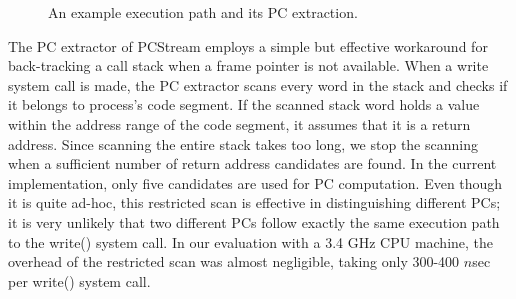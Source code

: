 \begin{figure}[t]
	\centering
	\hfill
	\caption{An example execution path and its PC extraction.} %
	\label{fig:getpc}
\end{figure}

The PC extractor of \textsf{\small PCStream} employs a simple but effective
workaround for back-tracking a call stack when a frame pointer is not
available.  When a write system call is made, the PC extractor scans every word
in the stack and checks if it belongs to process's code segment.  If the
scanned stack word holds a value within the address range of the code segment,
it assumes that it is a return address.  Since scanning the entire stack takes
too long, we stop the scanning when a sufficient number of return address
candidates are found. In the current implementation, only five candidates are
used for PC computation.  Even though it is quite ad-hoc, this restricted scan
is effective in distinguishing different PCs; it is very unlikely that two
different PCs follow exactly the same execution path to the \textsf{\small
write()} system call.  In our evaluation with a 3.4 GHz CPU machine, the
overhead of the restricted scan was almost negligible, taking only 300-400
$n$sec per \textsf{\small write()} system call.


